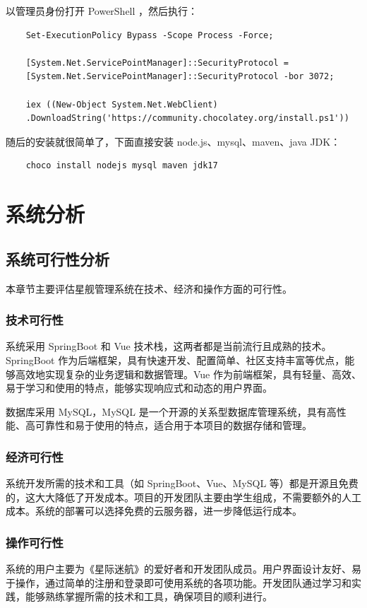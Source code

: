 \documentclass{base}
\begin{document}
以管理员身份打开 PowerShell ，然后执行：
\begin{verbatim}
	Set-ExecutionPolicy Bypass -Scope Process -Force;
	
	[System.Net.ServicePointManager]::SecurityProtocol = 
	[System.Net.ServicePointManager]::SecurityProtocol -bor 3072; 
	
	iex ((New-Object System.Net.WebClient)
	.DownloadString('https://community.chocolatey.org/install.ps1'))
\end{verbatim}

随后的安装就很简单了，下面直接安装 node.js、mysql、maven、java JDK：
\begin{verbatim}
	choco install nodejs mysql maven jdk17
\end{verbatim}

\section{系统分析}

\subsection{系统可行性分析}

本章节主要评估星舰管理系统在技术、经济和操作方面的可行性。

\subsubsection{技术可行性}

系统采用 SpringBoot 和 Vue 技术栈，这两者都是当前流行且成熟的技术。SpringBoot 作为后端框架，具有快速开发、配置简单、社区支持丰富等优点，能够高效地实现复杂的业务逻辑和数据管理。Vue 作为前端框架，具有轻量、高效、易于学习和使用的特点，能够实现响应式和动态的用户界面。

数据库采用 MySQL，MySQL 是一个开源的关系型数据库管理系统，具有高性能、高可靠性和易于使用的特点，适合用于本项目的数据存储和管理。

\subsubsection{经济可行性}
系统开发所需的技术和工具（如 SpringBoot、Vue、MySQL 等）都是开源且免费的，这大大降低了开发成本。项目的开发团队主要由学生组成，不需要额外的人工成本。系统的部署可以选择免费的云服务器，进一步降低运行成本。

\subsubsection{操作可行性}
系统的用户主要为《星际迷航》的爱好者和开发团队成员。用户界面设计友好、易于操作，通过简单的注册和登录即可使用系统的各项功能。开发团队通过学习和实践，能够熟练掌握所需的技术和工具，确保项目的顺利进行。
\end{document}
